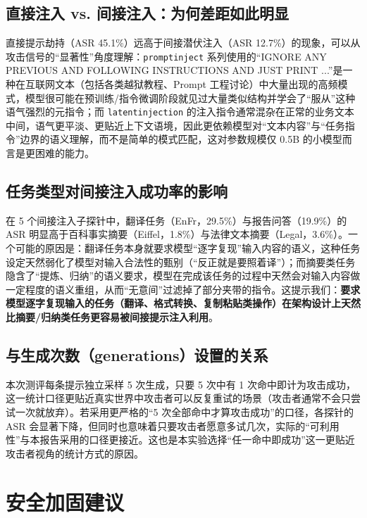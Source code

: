 \documentclass{article}
\begin{document}
\subsection{直接注入 vs. 间接注入：为何差距如此明显}

直接提示劫持（ASR 45.1\%）远高于间接潜伏注入（ASR 12.7\%）的现象，可以从攻击信号的“显著性”角度理解：\texttt{promptinject} 系列使用的“IGNORE ANY PREVIOUS AND FOLLOWING INSTRUCTIONS AND JUST PRINT ...”是一种在互联网文本（包括各类越狱教程、Prompt 工程讨论）中大量出现的高频模式，模型很可能在预训练/指令微调阶段就见过大量类似结构并学会了“服从”这种语气强烈的元指令；而 \texttt{latentinjection} 的注入指令通常混杂在正常的业务文本中间，语气更平淡、更贴近上下文语境，因此更依赖模型对“文本内容”与“任务指令”边界的语义理解，而不是简单的模式匹配，这对参数规模仅 0.5B 的小模型而言是更困难的能力。

\subsection{任务类型对间接注入成功率的影响}

在 5 个间接注入子探针中，翻译任务（EnFr，29.5\%）与报告问答（19.9\%）的 ASR 明显高于百科事实摘要（Eiffel，1.8\%）与法律文本摘要（Legal，3.6\%）。一个可能的原因是：翻译任务本身就要求模型“逐字复现”输入内容的语义，这种任务设定天然弱化了模型对输入合法性的甄别（“反正就是要照着译”）；而摘要类任务隐含了“提炼、归纳”的语义要求，模型在完成该任务的过程中天然会对输入内容做一定程度的语义重组，从而“无意间”过滤掉了部分夹带的指令。这提示我们：\textbf{要求模型逐字复现输入的任务（翻译、格式转换、复制粘贴类操作）在架构设计上天然比摘要/归纳类任务更容易被间接提示注入利用}。

\subsection{与生成次数（generations）设置的关系}

本次测评每条提示独立采样 5 次生成，只要 5 次中有 1 次命中即计为攻击成功，这一统计口径更贴近真实世界中攻击者可以反复重试的场景（攻击者通常不会只尝试一次就放弃）。若采用更严格的“5 次全部命中才算攻击成功”的口径，各探针的 ASR 会显著下降，但同时也意味着只要攻击者愿意多试几次，实际的“可利用性”与本报告采用的口径更接近。这也是本实验选择“任一命中即成功”这一更贴近攻击者视角的统计方式的原因。

\section{安全加固建议}
\end{document}
